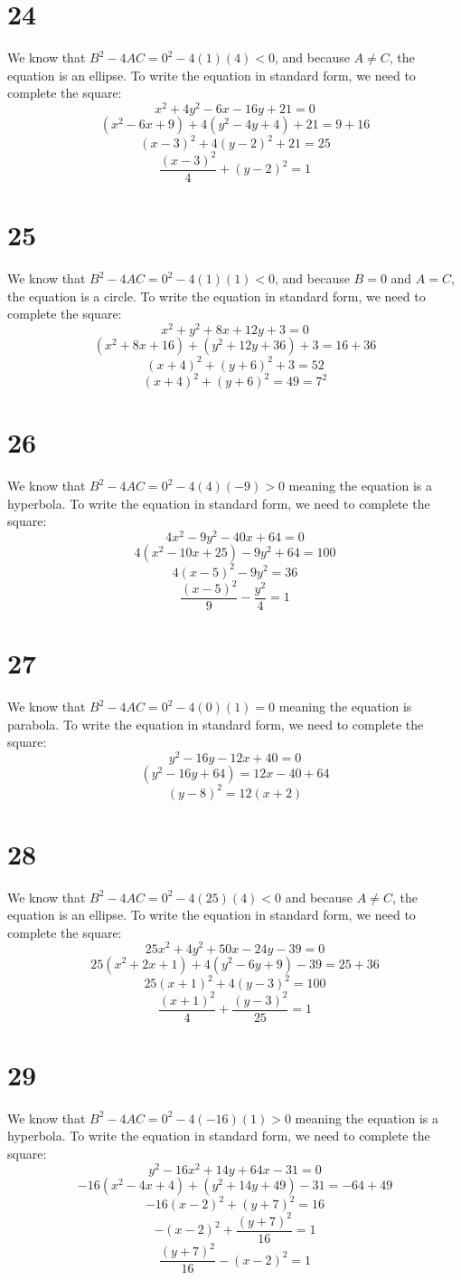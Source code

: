 \documentclass{article}
\theoremstyle{definition}
\newcommand{\?}{\stackrel{?}{=}}
\begin{document}
\section*{24}
We know that $B^2-4AC=0^2-4(1)(4)<0$, and because $A\ne C$, the equation is an ellipse. To write the equation in standard form, we need to complete the square:
\[ x^2+4y^2-6x-16y+21=0 \]
\[ (x^2-6x+9)+4(y^2-4y+4)+21=9+16 \]
\[ (x-3)^2+4(y-2)^2+21=25 \]
\[ \frac{(x-3)^2}{4}+(y-2)^2=1 \]

\section*{25}
We know that $B^2-4AC=0^2-4(1)(1)<0$, and because $B=0$ and $A=C$, the equation is a circle. To write the equation in standard form, we need to complete the square:
\[ x^2+y^2+8x+12y+3=0 \]
\[ (x^2+8x+16)+(y^2+12y+36)+3=16+36 \]
\[ (x+4)^2+(y+6)^2+3=52 \]
\[ (x+4)^2+(y+6)^2=49=7^2 \]

\section*{26}
We know that $B^2-4AC=0^2-4(4)(-9)>0$ meaning the equation is a hyperbola. To write the equation in standard form, we need to complete the square:
\[ 4x^2-9y^2-40x+64=0 \]
\[ 4(x^2-10x+25)-9y^2+64=100 \]
\[ 4(x-5)^2-9y^2=36 \]
\[ \frac{(x-5)^2}{9}-\frac{y^2}{4}=1 \]

\section*{27}
We know that $B^2-4AC=0^2-4(0)(1)=0$ meaning the equation is parabola. To write the equation in standard form, we need to complete the square:
\[ y^2-16y-12x+40=0 \]
\[ (y^2-16y+64)=12x-40+64 \]
\[ (y-8)^2=12(x+2) \]

\section*{28}
We know that $B^2-4AC=0^2-4(25)(4)<0$ and because $A\ne C$, the equation is an ellipse. To write the equation in standard form, we need to complete the square:
\[ 25x^2+4y^2+50x-24y-39=0 \]
\[ 25(x^2+2x+1)+4(y^2-6y+9)-39=25+36 \]
\[ 25(x+1)^2+4(y-3)^2=100 \]
\[ \frac{(x+1)^2}{4}+\frac{(y-3)^2}{25}=1 \]

\section*{29}
We know that $B^2-4AC=0^2-4(-16)(1)>0$ meaning the equation is a hyperbola. To write the equation in standard form, we need to complete the square:
\[ y^2-16x^2+14y+64x-31=0 \]
\[ -16(x^2-4x+4)+(y^2+14y+49)-31=-64+49 \]
\[ -16(x-2)^2+(y+7)^2=16 \]
\[ -(x-2)^2+\frac{(y+7)^2}{16}=1 \]
\[ \frac{(y+7)^2}{16}-(x-2)^2=1 \]
\end{document}
